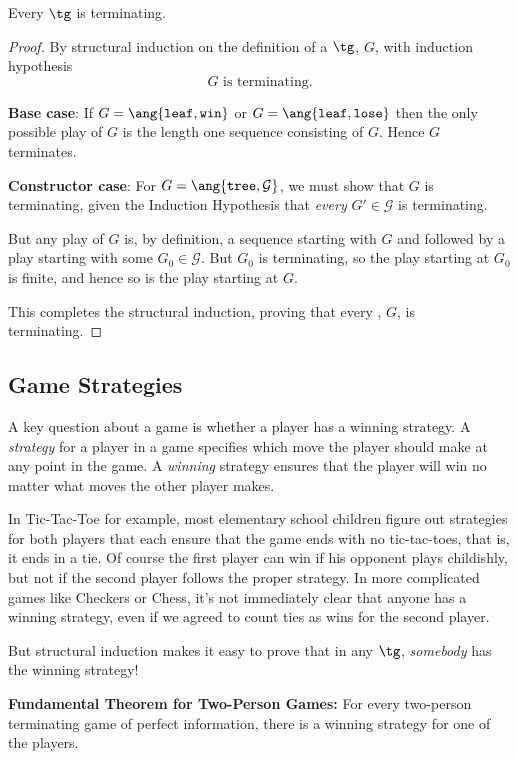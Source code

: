 \begin{definition}
\begin{theorem}
Every $\tg$ is terminating.
\end{theorem}

\begin{proof}
By structural induction on the definition of a $\tg$, $G$, with induction
hypothesis
\[
G \text{ is terminating}.
\]

\textbf{Base case}: If $G = \ang{\texttt{leaf}, \texttt{win}}$ or $G =
\ang{\texttt{leaf}, \texttt{lose}}$ then the only possible play of $G$ is
the length one sequence consisting of $G$.  Hence $G$ terminates.

\textbf{Constructor case}: For $G = \ang{\texttt{tree},\mathcal{G}}$, we
must show that $G$ is terminating, given the Induction Hypothesis that
\emph{every} $G' \in \mathcal{G}$ is terminating.

But any play of $G$ is, by definition, a sequence starting with $G$ and
followed by a play starting with some $G_0 \in \mathcal{G}$.  But $G_0$ is
terminating, so the play starting at $G_0$ is finite, and hence so is the
play starting at $G$.

This completes the structural induction, proving that every \tg, $G$, is
terminating.
\end{proof}


\subsection{Game Strategies}

A key question about a game is whether a player has a winning strategy.  A
\emph{strategy} for a player in a game specifies which move the player
should make at any point in the game.  A \emph{winning} strategy ensures
that the player will win no matter what moves the other player makes.

In Tic-Tac-Toe for example, most elementary school children figure out
strategies for both players that each ensure that the game ends with no
tic-tac-toes, that is, it ends in a tie.  Of course the first player can
win if his opponent plays childishly, but not if the second player follows
the proper strategy.  In more complicated games like Checkers or Chess,
it's not immediately clear that anyone has a winning strategy, even if we
agreed to count ties as wins for the second player.

But structural induction makes it easy to prove that in any $\tg$,
\emph{somebody} has the winning strategy!

\begin{theorem}\label{fund}
\textbf{Fundamental Theorem for Two-Person Games:} For every two-person
terminating game of perfect information, there is a winning strategy for
one of the players.
\end{theorem}


\end{definition}
